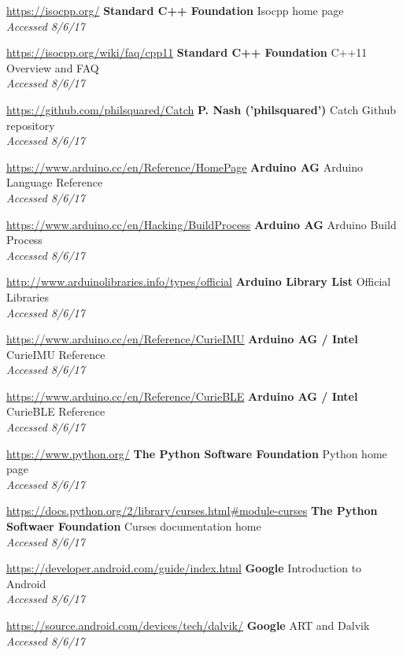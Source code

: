 \documentclass[a4paper]{article}
\begin{document}
\begin{thebibliography}{9}
\url{https://isocpp.org/}
\textbf{Standard C++ Foundation}
Isocpp home page
\\\textit{Accessed 8/6/17}

\url{https://isocpp.org/wiki/faq/cpp11}
\textbf{Standard C++ Foundation}
C++11 Overview and FAQ
\\\textit{Accessed 8/6/17}

\url{https://github.com/philsquared/Catch}
\textbf{P. Nash ('philsquared')}
Catch Github repository
\\\textit{Accessed 8/6/17}

\url{https://www.arduino.cc/en/Reference/HomePage}
\textbf{Arduino AG}
Arduino Language Reference
\\\textit{Accessed 8/6/17}

\url{https://www.arduino.cc/en/Hacking/BuildProcess}
\textbf{Arduino AG}
Arduino Build Process
\\\textit{Accessed 8/6/17}

\url{http://www.arduinolibraries.info/types/official}
\textbf{Arduino Library List}
Official Libraries
\\\textit{Accessed 8/6/17}

\url{https://www.arduino.cc/en/Reference/CurieIMU}
\textbf{Arduino AG / Intel}
CurieIMU Reference
\\\textit{Accessed 8/6/17}

\url{https://www.arduino.cc/en/Reference/CurieBLE}
\textbf{Arduino AG / Intel}
CurieBLE Reference
\\\textit{Accessed 8/6/17}

\url{https://www.python.org/}
\textbf{The Python Software Foundation}
Python home page
\\\textit{Accessed 8/6/17}

\url{https://docs.python.org/2/library/curses.html#module-curses}
\textbf{The Python Softwaer Foundation}
Curses documentation home
\\\textit{Accessed 8/6/17}

\url{https://developer.android.com/guide/index.html}
\textbf{Google}
Introduction to Android
\\\textit{Accessed 8/6/17}

\url{https://source.android.com/devices/tech/dalvik/}
\textbf{Google}
ART and Dalvik
\\\textit{Accessed 8/6/17}


\end{thebibliography}
\end{document}
